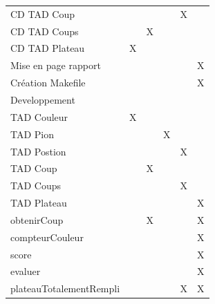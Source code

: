\documentclass{article}
\begin{document}
\begin{tabular}{|l|c|c|c|c|c|}
  CD TAD Coup & & & & X & \\                                                                                                                                                                             
  CD TAD Coups & & X & & & \\                                                                                                                                                                            
  CD TAD Plateau & X & & & & \\                              
  Mise en page rapport & & & & & X \\      
  Création Makefile & & & & & X \\
  \hline
  Developpement \\
  \hline
  TAD Couleur & X & & & & \\                                                                                                                                                                       
  TAD Pion & & & X & & \\                                                                                                                                                                              
  TAD Postion & & & & X &  \\                                                                                                                                                                          
  TAD Coup & & X & &  & \\                                                                                                                                                                              
  TAD Coups & & & & X & \\                                                                                                                                                                             
  TAD Plateau & & & & & X \\                                                                                                                                                                      
  obtenirCoup & & X & & & X \\
  compteurCouleur & & & & & X \\
  score & & & & & X \\
  evaluer & & & & & X \\
  plateauTotalementRempli & & & & X & X \\

\end{tabular}
\end{document}
